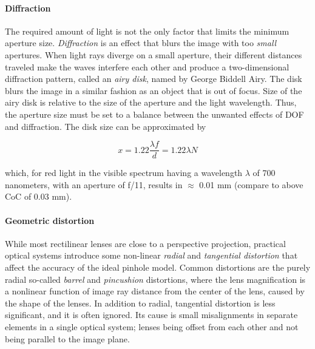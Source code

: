 
\paragraph{Diffraction}
The required amount of light is not the only factor that limits the minimum aperture size.
\emph{Diffraction} is an effect that blurs the image with too \emph{small} apertures.
When light rays diverge on a small aperture, their different distances traveled make the waves interfere each other and produce a two-dimensional diffraction pattern, called an \emph{airy disk}, named by  George Biddell Airy.
The disk blurs the image in a similar fashion as an object that is out of focus.
Size of the airy disk is relative to the size of the aperture and the light wavelength.
Thus, the aperture size must be set to a balance between the unwanted effects of DOF and diffraction.
The disk size can be approximated by

\begin{equation} \label{eq:airydisk}
	x = 1.22 \frac{\lambda f}{d} = 1.22 \lambda N
\end{equation}


which, for red light in the visible spectrum having a wavelength $\lambda$ of 700 nanometers, with an aperture of f/11, results in $\approx$ 0.01 mm (compare to above CoC of 0.03 mm).
\cite{greenleaf1950photographic}



\paragraph{Geometric distortion}
While most rectilinear lenses are close to a perspective projection, practical optical systems introduce some non-linear \emph{radial} and \emph{tangential distortion} that affect the accuracy of the ideal pinhole model.
Common distortions are the purely radial so-called \emph{barrel} and \emph{pincushion} distortions, where the lens magnification is a nonlinear function of image ray distance from the center of the lens, caused by the shape of the lenses. \cite{brown1966decentering}
In addition to radial, tangential distortion is less significant, and it is often ignored.
Its cause is small misalignments in separate elements in a single optical system; lenses being offset from each other and not being parallel to the image plane. \cite{kingslake1989history}


